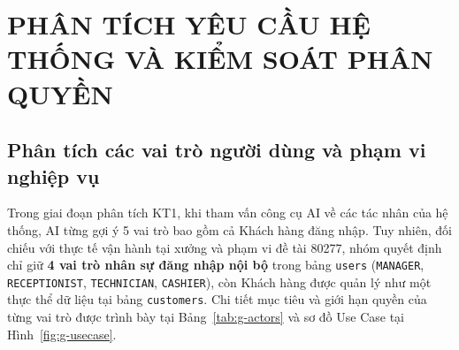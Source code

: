\chapter{PHÂN TÍCH YÊU CẦU HỆ THỐNG VÀ KIỂM SOÁT PHÂN QUYỀN}

\section{Phân tích các vai trò người dùng và phạm vi nghiệp vụ}

Trong giai đoạn phân tích KT1, khi tham vấn công cụ AI về các tác nhân của hệ thống, AI từng gợi ý 5 vai trò bao gồm cả Khách hàng đăng nhập. Tuy nhiên, đối chiếu với thực tế vận hành tại xưởng và phạm vi đề tài 80277, nhóm quyết định chỉ giữ \textbf{4 vai trò nhân sự đăng nhập nội bộ} trong bảng \texttt{users} (\texttt{MANAGER}, \texttt{RECEPTIONIST}, \texttt{TECHNICIAN}, \texttt{CASHIER}), còn Khách hàng được quản lý như một thực thể dữ liệu tại bảng \texttt{customers}. Chi tiết mục tiêu và giới hạn quyền của từng vai trò được trình bày tại Bảng~\ref{tab:g-actors} và sơ đồ Use Case tại Hình~\ref{fig:g-usecase}.


